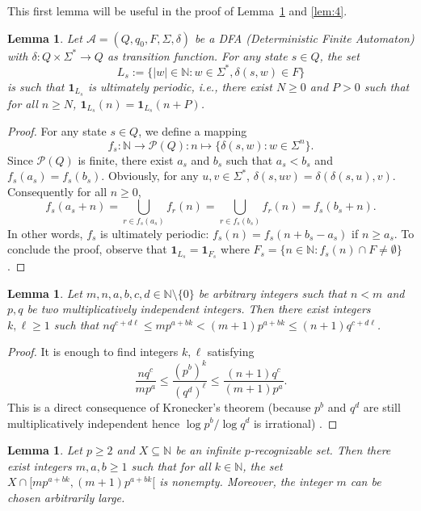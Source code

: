 \documentclass{beatcs}
\newtheorem{lemma}[proposition]{Lemma}
\begin{document}
This first lemma will be useful in the proof of Lemma~\ref{lem:3} and
\ref{lem:4}.
\begin{lemma}\label{lem:1}
  Let $\mathcal{A}=(Q,q_0,F,\Sigma,\delta)$ be a DFA (Deterministic
  Finite Automaton) with $\delta:Q\times\Sigma^*\to Q$ as transition
  function. For any state $s\in Q$, the set
  $$L_s:=\{|w|\in\mathbb{N} : w\in\Sigma^*, \delta(s,w)\in F\}$$
  is
  such that $\mathbf{1}_{L_s}$ is ultimately periodic, i.e., there
  exist $N\ge 0$ and $P>0$ such that for all $n\ge N$,
  $\mathbf{1}_{L_s}(n)=\mathbf{1}_{L_s}(n+P)$.
\end{lemma}

\begin{proof}
  For any state $s\in Q$, we define a mapping $$f_s:\mathbb{N}\to
  \mathcal{P}(Q):n\mapsto\{\delta(s,w):w\in\Sigma^n\}.$$
  Since
  $\mathcal{P}(Q)$ is finite, there exist $a_s$ and $b_s$ such that
  $a_s<b_s$ and $f_s(a_s)=f_s(b_s)$. Obviously, for any
  $u,v\in\Sigma^*$, $\delta(s,uv)=\delta(\delta(s,u),v)$. Consequently
  for all $n\ge 0$,
  $$f_s(a_s+n)=\bigcup_{r\in f_s(a_s)}f_r(n)=\bigcup_{r\in
    f_s(b_s)}f_r(n)=f_s(b_s+n).$$
  In other words, $f_s$ is ultimately
  periodic: $f_s(n)=f_s(n+b_s-a_s)$ if $n\ge a_s$. To conclude the
  proof, observe that $\mathbf{1}_{L_s}=\mathbf{1}_{F_s}$ where
  $F_s=\{n\in\mathbb{N}:f_s(n)\cap F\neq\emptyset\}$.
\end{proof}

\begin{lemma}\label{lem:2}
    Let $m,n,a,b,c,d\in\mathbb{N}\setminus\{0\}$ be arbitrary integers
    such that $n<m$ and $p,q$ be two multiplicatively independent
    integers.  Then there exist integers $k,\ell \ge 1$ such that
    $nq^{c+d\ell} \le mp^{a+bk} < (m+1)p^{a+bk} \le (n+1)q^{c+d\ell}$.
\end{lemma}

\begin{proof}
  It is enough to find integers $k,\ell$ satisfying
  $$\frac{nq^c}{mp^a}\le \frac{(p^b)^k}{(q^d)^\ell}\le
  \frac{(n+1)q^c}{(m+1)p^a}.$$
  This is a direct consequence of
  Kronecker's theorem (because $p^b$ and $q^d$ are still
  multiplicatively independent hence $\log p^b/\log q^d$ is
  irrational) \cite{HW}.
\end{proof}

\begin{lemma}\label{lem:3}
    Let $p\ge 2$ and $X\subseteq\mathbb{N}$ be an infinite
    $p$-recognizable set. Then there exist integers $m,a,b\ge 1$ such
    that for all $k\in\mathbb{N}$, the set
    $X\cap[mp^{a+bk},(m+1)p^{a+bk}[$ is nonempty. Moreover, the
    integer $m$ can be chosen arbitrarily large.
\end{lemma}
\end{document}
